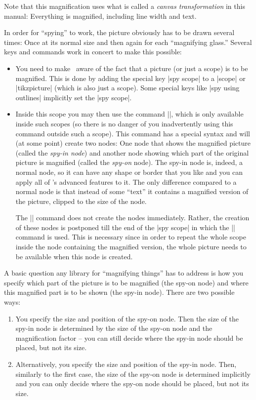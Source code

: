 Note that this magnification uses what is called a \emph{canvas
  transformation} in this manual: Everything is magnified, including
line width and text.

In order for ``spying'' to work, the picture obviously has to be drawn
several times: Once at its normal size and then again for each
``magnifying glass.'' Several keys and commands work in concert to
make this possible:
\begin{itemize}
\item You need to make \tikzname\ aware of the fact that a picture (or
  just a scope) is to be magnified. This is done by adding the special
  key |spy scope| to a |{scope}| or |{tikzpicture}| (which is also
  just a scope). Some special keys like |spy using outlines|
  implicitly set the |spy scope|.

\item Inside this scope you may then use the command |\spy|, which is
  only available inside such scopes (so there is no danger of you
  inadvertently using this command outside such a scope). This command
  has a special syntax and will (at some point) create two nodes: One
  node that shows the magnified picture (called the \emph{spy-in
    node}) and another node showing which part of the original picture
  is magnified (called the \emph{spy-on} node). The spy-in node is,
  indeed, a normal node, so it can have any shape or border that you
  like and you can apply all of \tikzname's advanced features to
  it. The only difference compared to a normal node is that instead of
  some ``text'' it contains a magnified version of the picture,
  clipped to the size of the node.

  The |\spy| command does not create the nodes immediately. Rather,
  the creation of these nodes is postponed till the end of the
  |spy scope| in which the |\spy| command is used. This is necessary
  since in order to repeat the whole scope inside the node containing
  the magnified version, the whole picture needs to be available when
  this node is created.
\end{itemize}

A basic question any library for ``magnifying things'' has to address
is how you specify which part of the picture is to be
magnified (the spy-on node) and where this magnified part is to be
shown (the spy-in node). There are two possible ways:
\begin{enumerate}
\item You specify the size and position of the spy-on node. Then the
  size of the spy-in node is determined by the size of the spy-on node
  and the magnification factor -- you can still decide where the
  spy-in node should be placed, but not its size.
\item Alternatively, you specify the size and position of the spy-in
  node. Then, similarly to the first case, the size of the spy-on node
  is determined implicitly and you can only decide where the
  spy-on node should be placed, but not its size.
\end{enumerate}

